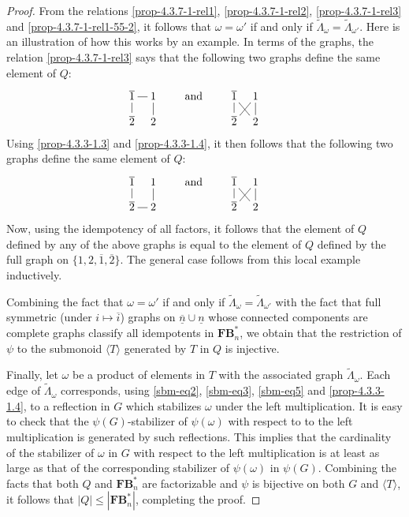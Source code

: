 \documentclass[a4paper]{amsart}
\begin{document}
\begin{proof}
From the relations \eqref{prop-4.3.7-1-rel1}, \eqref{prop-4.3.7-1-rel2}, 
\eqref{prop-4.3.7-1-rel3} and \eqref{prop-4.3.7-1-rel1-55-2}, it follows
that $\omega=\omega'$ if and only if $\tilde{\Lambda}_\omega=
\tilde{\Lambda}_{\omega'}$. Here is an illustration of how this works by an  example.
In terms of the graphs, the relation \eqref{prop-4.3.7-1-rel3} says that 
the following two graphs define the same element of $Q$:
\begin{displaymath}
\xymatrix@C=3mm@R=3mm{\overline{1}\ar@{-}[r]\ar@{-}[d]&1\ar@{-}[d]\\\overline{2}&2}\qquad \text{ and }\qquad
\xymatrix@C=3mm@R=3mm{\overline{1}\ar@{-}[rd]\ar@{-}[d]&1\ar@{-}[d]\ar@{-}[ld]\\\overline{2}&2}\qquad 
\end{displaymath}
Using \eqref{prop-4.3.3-1.3} and \eqref{prop-4.3.3-1.4}, it then follows that 
the following two graphs define the same element of $Q$:
\begin{displaymath}
\xymatrix@C=3mm@R=3mm{\overline{1}\ar@{-}[d]&1\ar@{-}[d]\\\overline{2}\ar@{-}[r]&2}\qquad \text{ and }\qquad
\xymatrix@C=3mm@R=3mm{\overline{1}\ar@{-}[rd]\ar@{-}[d]&1\ar@{-}[d]\ar@{-}[ld]\\\overline{2}&2}\qquad 
\end{displaymath}
Now, using the idempotency of all factors, it follows that the element of $Q$
defined by any of the above graphs is equal to the element of $Q$
defined by the full graph on $\{1,2,\overline{1},\overline{2}\}$.
The general case follows from this local example inductively.

Combining the fact that $\omega=\omega'$ if and only if $\tilde{\Lambda}_\omega=
\tilde{\Lambda}_{\omega'}$ with the fact that full  symmetric
(under $i\mapsto\overline{i}$) graphs on $\overline{\underline{n}}\cup\underline{n}$
whose connected components are complete graphs classify all idempotents in 
$\mathbf{FB}^*_n$, we  obtain that the restriction of $\psi$ to the submonoid
$\langle T\rangle$ generated by $T$ in $Q$ is injective.

Finally, let $\omega$ be a product of elements in 
$T$ with the associated graph $\tilde{\Lambda}_\omega$.
Each edge of $\tilde{\Lambda}_\omega$ corresponds,
using \eqref{sbm-eq2}, \eqref{sbm-eq3}, \eqref{sbm-eq5}
and \eqref{prop-4.3.3-1.4}, to a reflection in $G$
which stabilizes $\omega$ under the left multiplication.
It is easy to check that the $\psi(G)$-stabilizer of 
$\psi(\omega)$ with respect to to the left multiplication
is generated by such reflections.
This implies that the cardinality of the stabilizer 
of $\omega$ in $G$ with respect to the left multiplication
is at least as large as that of the corresponding stabilizer 
of $\psi(\omega)$ in $\psi(G)$.
Combining the facts that both $Q$ and $\mathbf{FB}^*_n$ 
are factorizable and $\psi$ is bijective on both $G$
and $\langle T\rangle$, it follows that 
$|Q|\leq |\mathbf{FB}^*_n|$, completing the proof.
\end{proof}
\end{document}
